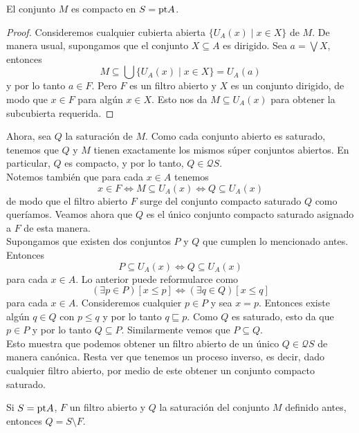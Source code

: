\begin{lem}
    El conjunto $M$ es compacto en $S=\mathrm{pt} A$.
\end{lem}

\begin{proof}
    Consideremos cualquier cubierta abierta $\{U_A(x)\mid x\in X\}$ de $M$. De manera usual, supongamos que el conjunto $X\subseteq A$ es dirigido. Sea $a=\bigvee X$, entonces
    \[
    M\subseteq \bigcup \{U_A(x)\mid x\in X\}=U_A(a)
    \]
    y por lo tanto $a\in F$. Pero $F$ es un filtro abierto y $X$ es un conjunto dirigido, de modo que $x\in F$ para algún $x\in X$. Esto nos da $M\subseteq U_A(x)$ para obtener la subcubierta requerida.
\end{proof}

Ahora, sea $Q$ la saturación de $M$. Como cada conjunto abierto es saturado, tenemos que $Q$ y $M$ tienen exactamente los mismos súper conjuntos abiertos. En particular, $Q$ es compacto, y por lo tanto, $Q\in \mathcal{Q}S$.\\

Notemos también que para cada $x\in A$ tenemos
\begin{equation}\label{HMcaracterizacion}
x\in F\Leftrightarrow M\subseteq U_A(x)\Leftrightarrow Q\subseteq U_A(x)
\end{equation}
de modo que el filtro abierto $F$ surge del conjunto compacto saturado $Q$ como queríamos. Veamos ahora que $Q$ es el único conjunto compacto saturado asignado a $F$ de esta manera.\\

Supongamos que existen dos conjuntos $P$ y $Q$ que cumplen lo mencionado antes. Entonces 
\[
P\subseteq U_A(x)\Leftrightarrow Q\subseteq U_A(x)
\]
para cada $x\in A$. Lo anterior puede reformularce como 
\[
(\exists p\in P)[x\leq p]\Leftrightarrow (\exists q\in Q)[x\leq q]
\]
para cada $x\in A$. Consideremos cualquier $p\in P$ y sea $x=p$. Entonces existe algún $q\in Q$ con $p\leq q$ y por lo tanto $q\sqsubseteq p$. Como $Q$ es saturado, esto da que $p\in P$ y por lo tanto $Q\subseteq P$. Similarmente vemos que $P\subseteq Q$.\\

Esto muestra que podemos obtener un filtro abierto de un único $Q\in \mathcal{Q}S$ de manera canónica. Resta ver que tenemos un proceso inverso, es decir, dado cualquier filtro abierto, por medio de este obtener un conjunto compacto saturado.

\begin{lem}\label{HM2}
    Si $S=\mathrm{pt} A$, $F$ un filtro abierto y $Q$ la saturación del conjunto $M$ definido antes, entonces $Q=S\setminus F$.
\end{lem}

